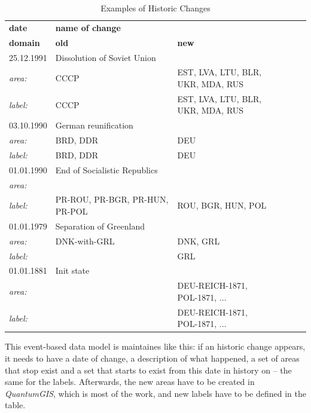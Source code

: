 \begin{table}[H]
\begin{small}
  \caption{Examples of Historic Changes}
  \label{tab:tablename}
  \begin{center}
    \begin{tabular}{lllllll}
    \hline

    \hline
    \textbf{date} & \textbf{name of change} & \\
    \textbf{domain} & \textbf{old} & \textbf{new} \\
    \hline
    25.12.1991 & Dissolution of Soviet Union & \\
    \textit{area:} & CCCP & \pbox{5cm}{EST, LVA, LTU, BLR, \\ UKR, MDA, RUS} \\
    \textit{label:} & CCCP & \pbox{5cm}{EST, LVA, LTU, BLR, \\ UKR, MDA, RUS }\\
    \hline
    03.10.1990 & German reunification & \\
    \textit{area:} & BRD, DDR & DEU \\
    \textit{label:} & BRD, DDR & DEU \\
    \hline
    01.01.1990 & End of Socialistic Republics & \\
    \textit{area:} & & \\
    \textit{label:} & PR-ROU, PR-BGR, PR-HUN, PR-POL & ROU, BGR, HUN, POL \\
    \hline
    01.01.1979 & Separation of Greenland & \\
    \textit{area:} & DNK-with-GRL & DNK, GRL \\
    \textit{label:} & & GRL \\
    \hline
    01.01.1881 & Init state & \\
    \textit{area:} & & DEU-REICH-1871, POL-1871, ... \\
    \textit{label:} & & DEU-REICH-1871, POL-1871, ... \\
    \hline

    \hline
    \end{tabular}
  \end{center}
\end{small}
\end{table}

This event-based data model is maintaines like this: if an historic change appears, it needs to have a date of change, a description of what happened, a set of areas that stop exist and a set that starts to exist from this date in history on -- the same for the labels. Afterwards, the new areas have to be created in \textit{QuantumGIS}, which is most of the work, and new labels have to be defined in the table.

